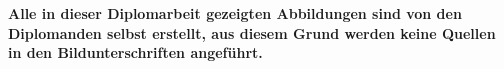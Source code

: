 \listoffigures
\vfill
\textbf{Alle in dieser Diplomarbeit gezeigten Abbildungen sind von den Diplomanden selbst erstellt, aus diesem Grund werden keine Quellen in den Bildunterschriften angeführt.}